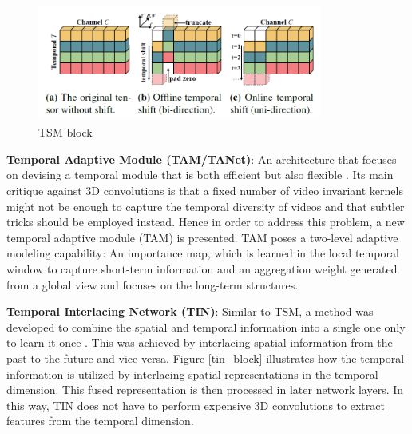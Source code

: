 \documentclass[extern,palatino]{cgMA}
\begin{document}
\begin{figure}[h]
\center
\includegraphics[height={110pt}, width={265pt}]{images/tsm_block.png}
\caption{TSM block \cite{lin2019tsm}}
\label{tsm_block}
\end{figure}

\bigskip
\noindent\textbf{Temporal Adaptive Module (TAM/TANet)}: An architecture that focuses on devising a temporal module that is both efficient but also flexible \cite{liu2020tam}. Its main critique against 3D convolutions is that a fixed number of video invariant kernels might not be enough to capture the temporal diversity of videos and that subtler tricks should be employed instead. Hence in order to address this problem, a new temporal adaptive module (TAM) is presented. TAM poses a two-level adaptive modeling capability: An importance map, which is learned in the local temporal window to capture short-term information and an aggregation weight generated from a global view and focuses on the long-term structures.

\bigskip
\noindent\textbf{Temporal Interlacing Network (TIN)}: Similar to TSM, a method was developed to combine the spatial and temporal information into a single one only to learn it once \cite{shao2020temporal}. This was achieved by interlacing spatial information from the past to the future and vice-versa. Figure \ref{tin_block} illustrates how the temporal information is utilized by interlacing spatial representations in the temporal dimension. This fused representation is then processed in later network layers. In this way, TIN does not have to perform expensive 3D convolutions to extract features from the temporal dimension.
\end{document}
